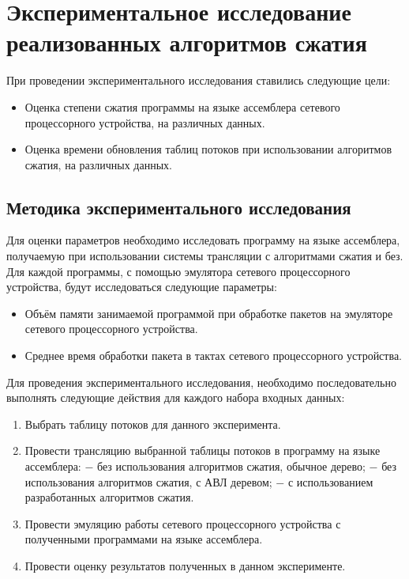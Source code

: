 \documentclass[oneside,final,12pt]{extarticle}
\begin{document}
    \section{Экспериментальное исследование реализованных алгоритмов сжатия}
        \label{sect:eval}
        При проведении экспериментального исследования ставились следующие цели:
        \begin{itemize}
            \item Оценка степени сжатия программы на языке ассемблера сетевого процессорного устройства, на различных данных.
            \item Оценка времени обновления таблиц потоков при использовании алгоритмов сжатия, на различных данных.
        \end{itemize}
        \subsection{Методика экспериментального исследования}
            Для оценки параметров необходимо исследовать программу на языке ассемблера, получаемую при использовании
            системы трансляции с алгоритмами сжатия и без. Для каждой программы, с помощью эмулятора сетевого процессорного устройства,
            будут исследоваться следующие параметры:
            \begin{itemize}
                \item Объём памяти занимаемой программой при обработке пакетов на эмуляторе сетевого процессорного устройства.
                \item Среднее время обработки пакета в тактах сетевого процессорного устройства.
            \end{itemize}
            
            Для проведения экспериментального исследования, необходимо последовательно выполнять следующие действия для каждого набора входных данных:
            \begin{enumerate}
                \item Выбрать таблицу потоков для данного эксперимента.
                \item Провести трансляцию выбранной таблицы потоков в программу на языке ассемблера:
                    \subitem $-$ без использования алгоритмов сжатия, обычное дерево;
                    \subitem $-$ без использования алгоритмов сжатия, с АВЛ деревом;
                    \subitem $-$ с использованием разработанных алгоритмов сжатия.
                \item Провести эмуляцию работы сетевого процессорного устройства с полученными программами на языке ассемблера.
                \item Провести оценку результатов полученных в данном эксперименте.
            \end{enumerate}
\end{document}

